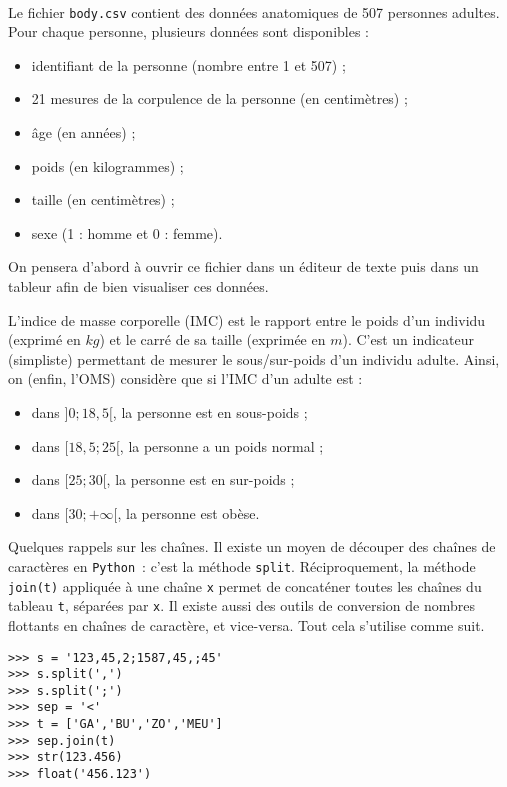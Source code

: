 \exer{[FIC-010]}
\setcounter{numques}{0}~\\


Le fichier \texttt{body.csv} contient des données anatomiques de 507 personnes adultes. Pour chaque personne, plusieurs données sont disponibles : 
\begin{itemize}
  \item identifiant de la personne (nombre entre 1 et 507) ;
  \item 21 mesures de la corpulence de la personne (en centimètres) ;
  \item âge (en années) ;
  \item poids (en kilogrammes) ; 
  \item taille (en centimètres) ;
  \item sexe (1 : homme et 0 : femme).
\end{itemize}

On pensera d'abord à ouvrir ce fichier dans un éditeur de texte puis dans un tableur afin de bien visualiser ces données. 

L'indice de masse corporelle (IMC) est le rapport entre le poids d'un individu (exprimé en $kg$) et le carré de sa taille (exprimée en $m$). 
C'est un indicateur (simpliste) permettant de mesurer le sous/sur-poids d'un individu adulte. 
Ainsi, on (enfin, l'OMS) considère que si l'IMC d'un adulte est : 


\begin{itemize}
  \item dans $]0;18,5[$, la personne est en sous-poids ;
  \item dans $[18,5;25[$, la personne a un poids normal ; 
  \item dans $[25;30[$, la personne est en sur-poids ; 
  \item dans $[30;+\infty[$, la personne est obèse. 
\end{itemize}

Quelques rappels sur les chaînes. Il existe un moyen de \og découper \fg{} des chaînes de caractères en \texttt{Python}\ : c'est la méthode \texttt{split}. 
Réciproquement, la méthode \texttt{join(t)} appliquée à une chaîne \texttt{x} permet de concaténer toutes les chaînes du tableau \texttt{t}, séparées par \texttt{x}.
Il existe aussi des outils de conversion de nombres flottants en chaînes de caractère, et vice-versa.
Tout cela s'utilise comme suit.

\begin{lstlisting}
>>> s = '123,45,2;1587,45,;45'
>>> s.split(',')
>>> s.split(';')
>>> sep = '<'
>>> t = ['GA','BU','ZO','MEU']
>>> sep.join(t)
>>> str(123.456)
>>> float('456.123')
\end{lstlisting}

